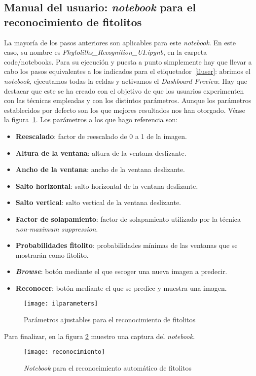 \subsection{Manual del usuario: \textit{notebook} para el reconocimiento de fitolitos}

La mayoría de los pasos anteriores son aplicables para este \textit{notebook}. En este caso, su nombre es \textit{Phytoliths\_Recognition\_UI.ipynb}, en la carpeta code/notebooks. Para su ejecución y puesta a punto simplemente hay que llevar a cabo los pasos equivalentes a los indicados para el etiquetador~\ref{iluser}: abrimos el \textit{notebook}, ejecutamos todas la celdas y activamos el \textit{Dashboard Preview}. Hay que destacar que este se ha creado con el objetivo de que los usuarios experimenten con las técnicas empleadas y con los distintos parámetros. Aunque los parámetros establecidos por defecto son los que mejores resultados nos han otorgado. Véase la figura~\ref{fig:E.4.8.4}. Los parámetros a los que hago referencia son:

\begin{itemize}
	\item \textbf{Reescalado}: factor de reescalado de 0 a 1 de la imagen.
	\item \textbf{Altura de la ventana}: altura de la ventana deslizante.
	\item \textbf{Ancho de la ventana}: ancho de la ventana deslizante.
	\item \textbf{Salto horizontal}: salto horizontal de la ventana deslizante.
	\item \textbf{Salto vertical}: salto vertical de la ventana deslizante.
	\item \textbf{Factor de solapamiento}: factor de solapamiento utilizado por la técnica \textit{non-maximum suppression}.
	\item \textbf{Probabilidades fitolito}: probabilidades mínimas de las ventanas que se mostrarán como fitolito.
	\item \textbf{\textit{Browse}}: botón mediante el que escoger una nueva imagen a predecir.
	\item \textbf{Reconocer}: botón mediante el que se predice y muestra una imagen.
\end{itemize}

\begin{figure}
\centering
\texttt{[image: ilparameters]}
\caption[Parámetros para el reconocimiento de fitolitos]{Parámetros ajustables para el reconocimiento de fitolitos}
\label{fig:E.4.8.4}
\end{figure}

Para finalizar, en la figura \ref{fig:E.4.8.5} muestro una captura del \textit{notebook}.

\begin{figure}
\centering
\texttt{[image: reconocimiento]}
\caption{\textit{Notebook} para el reconocimiento automático de fitolitos}
\label{fig:E.4.8.5}
\end{figure}
